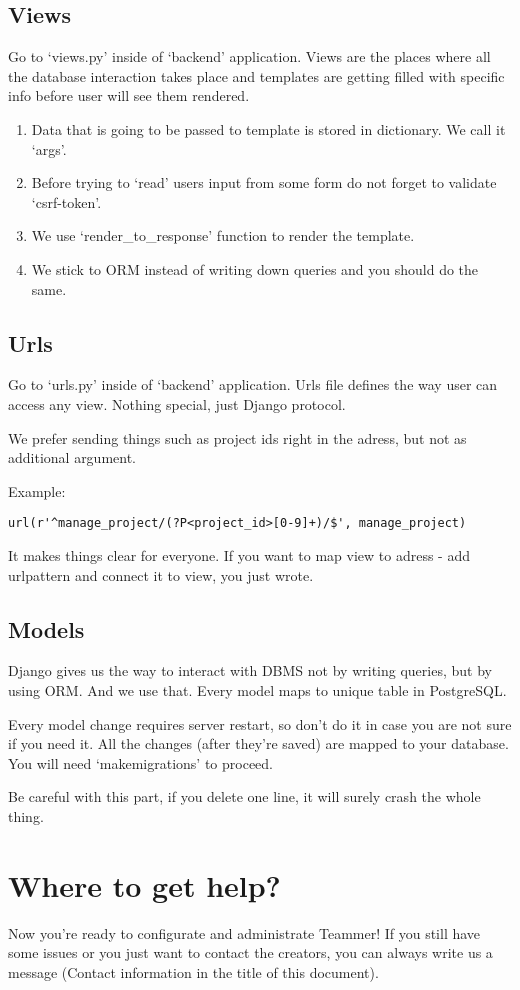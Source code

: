 \documentclass{report}
\begin{document}
\subsection{Views}
Go to ‘views.py’ inside of ‘backend’ application. Views are the places where all the database interaction takes place and templates are getting filled with specific info before user will see them rendered.
\begin{enumerate}
\item Data that is going to be passed to template is stored in dictionary. We call it ‘args’.
\item Before trying to ‘read’ users input from some form do not forget to validate ‘csrf-token’.
\item We use ‘render\_to\_response’ function to render the template.
\item We stick to ORM instead of writing down queries and you should do the same.
\end{enumerate}

\subsection{Urls}
Go to ‘urls.py’ inside of ‘backend’ application. Urls file defines the way user can access any view. Nothing special, just Django protocol.

We prefer sending things such as project ids right in the adress, but not as additional argument.

Example:
\begin{lstlisting}[frame=single]
url(r'^manage_project/(?P<project_id>[0-9]+)/$', manage_project)
\end{lstlisting}

It makes things clear for everyone. If you want to map view to adress - add urlpattern and connect it to view, you just wrote.

\subsection{Models}
Django gives us the way to interact with DBMS not by writing queries, but by using ORM.
And we use that. Every model maps to unique table in PostgreSQL.

Every model change requires server restart, so don’t do it in case you are not sure if you need it. All the changes (after they’re saved) are mapped to your database. You will need ‘makemigrations’ to proceed.

Be careful with this part, if you delete one line, it will surely crash the whole thing.

\section{Where to get help?}

Now you’re ready to configurate and administrate Teammer! If you still have some issues or you just want to contact the creators, you can always write us a message (Contact information in the title of this document).
\end{document}
